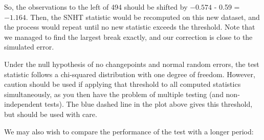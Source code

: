 \documentclass[nojss]{jss}\usepackage[]{graphicx}\usepackage[]{color}
\begin{document}
So, the observations to the left of 494 should be shifted by \ensuremath{-0.574} - 0.59 = \ensuremath{-1.164}.  Then, the SNHT statistic would be recomputed on this new dataset, and the process would repeat until no new statistic exceeds the threshold.  Note that we managed to find the largest break exactly, and our correction is close to the simulated error.

Under the null hypothesis of no changepoints and normal random errors, the test statistic follows a chi-squared distribution with one degree of freedom.  However, caution should be used if applying that threshold to all computed statistics simultaneously, as you then have the problem of multiple testing (and non-independent tests).  The blue dashed line in the plot above gives this threshold, but should be used with care.

We may also wish to compare the performance of the test with a longer period:
\end{document}
